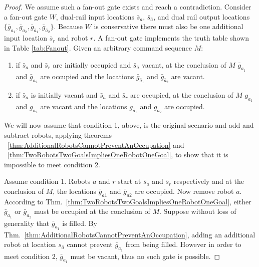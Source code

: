 \documentclass[letterpaper, 10 pt, conference]{ieeeconf}
\begin{document}

\begin{proof} We assume such a {\sc fan-out} gate exists and reach a contradiction. 
Consider a  {\sc fan-out} gate $W$,  dual-rail input locations  $\bar{s}_{a}$, $\bar{s}_{\bar{a}}$, and dual rail output locations  $\{\bar{g}_{a_1}, \bar{g}_{a_2},\bar{g}_{\bar{a}_1},\bar{g}_{\bar{a}_2}\}$. Because $W$ is conservative there must also be one additional input location $\bar{s}_r$ and robot $r$. A {\sc fan-out} gate implements the truth table shown in Table \ref{tab:Fanout}. Given an arbitrary command sequence $M$:  
\begin{enumerate}
\item if $\bar{s}_{a}$  and $\bar{s}_r$ are initially occupied and $\bar{s}_{\bar{a}}$ vacant, at the conclusion of $M$ $\bar{g}_{a_1}$ and $\bar{g}_{a_2}$ are occupied and the locations  $\bar{g}_{\bar{a}_1}$ and $\bar{g}_{\bar{a}_2}$ are vacant.
\item if $\bar{s}_{a}$ is initially vacant and $\bar{s}_{\bar{a}}$ and $\bar{s}_r$ are occupied, at the conclusion of $M$ $g_{a_1}$ and $g_{a_2}$ are vacant and the locations  $g_{\bar{a}_1}$ and $g_{\bar{a}_2}$ are occupied.
\end{enumerate}

We will now assume that condition 1, above, is the original scenario and  add and subtract robots, applying theorems ~\ref{thm:AdditionalRobotsCannotPreventAnOccupation} and ~\ref{thm:TwoRobotsTwoGoalsImpliesOneRobotOneGoal}, to show that it is impossible to meet condition 2. 

Assume condition 1. Robots $a$ and $r$ start at $\bar{s}_{a}$ and $\bar{s}_r$  respectively and at the conclusion of $M$, the locations  $\bar{g}_{a1}$ and $\bar{g}_{a2}$ are occupied. Now remove robot $a$. According to  Thm.~\ref{thm:TwoRobotsTwoGoalsImpliesOneRobotOneGoal}, either $\bar{g}_{a_1}$ or $\bar{g}_{a_2}$ must be occupied at the conclusion of $M$. Suppose without loss of generality that $\bar{g}_{a_1}$ is filled.  By Thm.~\ref{thm:AdditionalRobotsCannotPreventAnOccupation}, adding an additional robot at location $s_{\bar{a}}$ cannot prevent $\bar{g}_{a_1}$ from being filled. However in order to meet condition 2, $\bar{g}_{a_1}$ must be vacant, thus no such gate is possible. 
 \end{proof}
\end{document}
